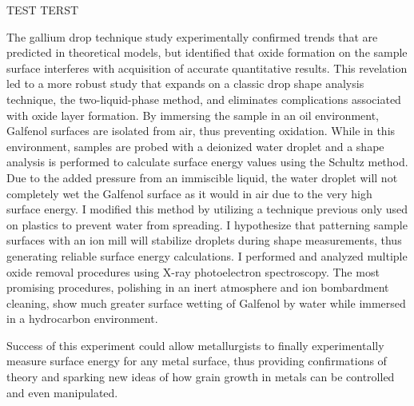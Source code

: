 TEST TERST 

The gallium drop technique study experimentally confirmed trends that are predicted in theoretical models, but identified that oxide formation on the sample surface interferes with acquisition of accurate quantitative results. This revelation led to a more robust study that expands on a classic drop shape analysis technique, the two-liquid-phase method, and eliminates complications associated with oxide layer formation. By immersing the sample in an oil environment, Galfenol surfaces are isolated from air, thus preventing oxidation. While in this environment, samples are probed with a deionized water droplet and a shape analysis is performed to calculate surface energy values using the Schultz method. Due to the added pressure from an immiscible liquid, the water droplet will not completely wet the Galfenol surface as it would in air due to the very high surface energy. I modified this method by utilizing a technique previous only used on plastics to prevent water from spreading. I hypothesize that patterning sample surfaces with an ion mill will stabilize droplets during shape measurements, thus generating reliable surface energy calculations. I performed and analyzed multiple oxide removal procedures using X-ray photoelectron spectroscopy. The most promising procedures, polishing in an inert atmosphere and ion bombardment cleaning, show much greater surface wetting of Galfenol by water while immersed in a hydrocarbon environment.

Success of this experiment could allow metallurgists to finally experimentally measure surface energy for any metal surface, thus providing confirmations of theory and sparking new ideas of how grain growth in metals can be controlled and even manipulated. 

